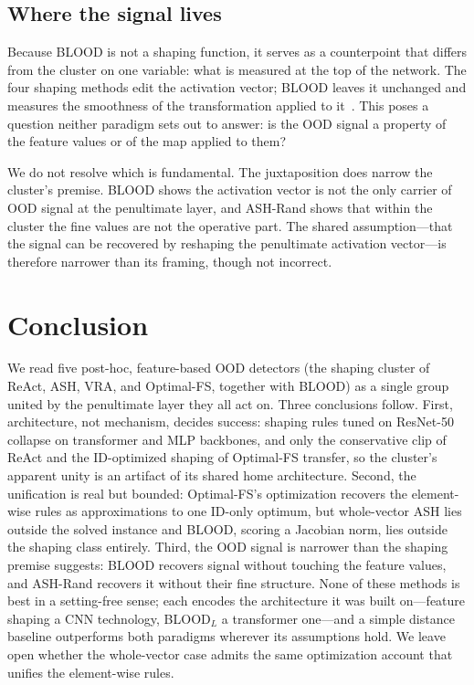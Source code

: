 \documentclass[a4paper]{article}
\begin{document}
\subsection{Where the signal lives}
\label{subsec:disc-carrier}
 
Because BLOOD is not a shaping function, it serves as a counterpoint that differs from
the cluster on one variable: what is measured at the top of the network. The four shaping
methods edit the activation vector; BLOOD leaves it unchanged and measures the smoothness
of the transformation applied to it~\citep{blood}. This poses a question neither paradigm
sets out to answer: is the OOD signal a property of the feature values or of the map
applied to them?

We do not resolve which is fundamental. The juxtaposition does narrow the cluster's
premise. BLOOD shows the activation vector is not the only carrier of OOD signal at the
penultimate layer, and ASH-Rand shows that within the cluster the fine values are not the
operative part. The shared assumption---that the signal can be recovered by reshaping the
penultimate activation vector---is therefore narrower than its framing, though not
incorrect.

\section{Conclusion}
\label{conc}

We read five post-hoc, feature-based OOD detectors (the shaping cluster of ReAct,
ASH, VRA, and Optimal-FS, together with BLOOD) as a single group united by the
penultimate layer they all act on. Three conclusions follow. First, architecture, not
mechanism, decides success: shaping rules tuned on ResNet-50 collapse on transformer
and MLP backbones, and only the conservative clip of ReAct and the ID-optimized shaping
of Optimal-FS transfer, so the cluster's apparent unity is an artifact of its shared
home architecture. Second, the unification is real but bounded: Optimal-FS's
optimization recovers the element-wise rules as approximations to one ID-only optimum,
but whole-vector ASH lies outside the solved instance and BLOOD, scoring a Jacobian
norm, lies outside the shaping class entirely. Third, the OOD signal is narrower than
the shaping premise suggests: BLOOD recovers signal without touching the feature
values, and ASH-Rand recovers it without their fine structure. None of these methods is
best in a setting-free sense; each encodes the architecture it was built
on---feature shaping a CNN technology, BLOOD$_L$ a transformer one---and a simple
distance baseline outperforms both paradigms wherever its assumptions hold. We leave open whether the whole-vector case admits the same optimization account
that unifies the element-wise rules.
\end{document}
